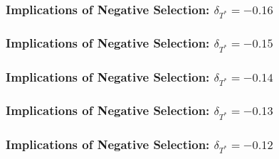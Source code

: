 \documentclass{beamer}
\begin{document}
\begin{frame}[noframenumbering]
  \frametitle{Implications of Negative Selection: $\delta_{T^*} = -0.16$}
\begin{figure}[h]
  \scriptsize
  \begingroup
  \centering
  
  \endgroup
\end{figure}
\end{frame}
\begin{frame}[noframenumbering]
  \frametitle{Implications of Negative Selection: $\delta_{T^*} = -0.15$}
\begin{figure}[h]
  \scriptsize
  \begingroup
  \centering
  
  \endgroup
\end{figure}
\end{frame}
\begin{frame}[noframenumbering]
  \frametitle{Implications of Negative Selection: $\delta_{T^*} = -0.14$}
\begin{figure}[h]
  \scriptsize
  \begingroup
  \centering
  
  \endgroup
\end{figure}
\end{frame}
\begin{frame}[noframenumbering]
  \frametitle{Implications of Negative Selection: $\delta_{T^*} = -0.13$}
\begin{figure}[h]
  \scriptsize
  \begingroup
  \centering
  
  \endgroup
\end{figure}
\end{frame}
\begin{frame}[noframenumbering]
  \frametitle{Implications of Negative Selection: $\delta_{T^*} = -0.12$}
\begin{figure}[h]
  \scriptsize
  \begingroup
  \centering
  
  \endgroup
\end{figure}
\end{frame}
\end{document}
